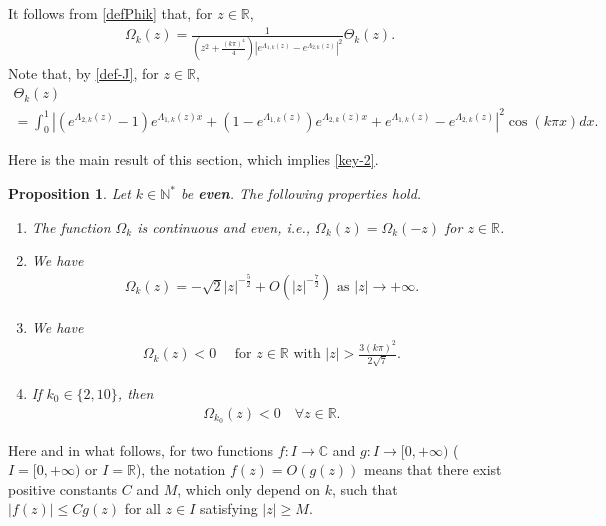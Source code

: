 \documentclass[11pt, reqno]{amsart}
\theoremstyle{plain}
\newtheorem{proposition}[thm]{Proposition}
\numberwithin{equation}{section}
\newcommand{\mR}{\mathbb{R}}
\newcommand{\mN}{\mathbb{N}}
\begin{document}
 It follows from \eqref{defPhik} that, for $z \in \mR$,
 \begin{align}	\label{Omegakformula}
        \Omega_k(z) = \frac{1}{\left(z^2 + \frac{(k \pi)^4}{4} \right) \left|e^{\Lambda_{1,k}(z)} - e^{\Lambda_{2,k}(z)} \right|^2} \Theta_k(z). 
 \end{align}
Note that, by \eqref{def-J}, for $z \in \mR$, 
 \begin{multline}	\label{Thetakformula}
\Theta_k(z) \\[6pt]
= \int_0^1 \left| \left(e^{\Lambda_{2,k}(z)} - 1 \right) e^{\Lambda_{1,k}(z) x} + \left(1 - e^{\Lambda_{1,k}(z)} \right) e^{\Lambda_{2,k}(z) x} + e^{\Lambda_{1,k}(z)} - e^{\Lambda_{2,k}(z)} \right|^2 \cos(k \pi x) dx. 
 \end{multline}
 


Here is the main result of this section, which implies \eqref{key-2}.

\begin{proposition} \label{as-behavior}  \label{sign}  \label{even+continuous} 
Let $k \in \mN^*$  be {\bf even}. The following properties hold. 
\begin{enumerate}
	\item[1)] \label{Oeven} The function $\Omega_k$ is continuous and even, i.e.,  $\Omega_k(z) = \Omega_k(-z)$ for  $z \in \mR$.
	 
    \item[2)] \label{Oasym} We have
    \begin{align}  
       \Omega_k(z) = -\sqrt{2} |z|^{-\frac{5}{2}} + O \left(|z|^{-\frac{7}{2}} \right) \text{ as }  |z| \to +\infty.
    \end{align}
    	\item[3)] We have
    	\begin{align}
    		\Omega_k(z) < 0 \quad \mbox{ for } z \in \mR \mbox{ with }  |z| > \frac{3(k \pi)^2}{2 \sqrt{7}}.
    	\end{align}
    \item[4)] \label{Onegative} If $k_0 \in \{2, 10\}$, then
    \begin{align}
        \Omega_{k_0}(z) < 0 \quad \forall z \in \mathbb{R}.
    \end{align}
\end{enumerate}
\end{proposition}

Here and in what follows, for two functions $f: I \to \mathbb{C}$ and $g: I \to [0, + \infty)$ ($I = [0,+\infty)$ or $I = \mR$), the notation $f(z) = O(g(z))$ means that there exist positive constants $C$ and $M$, which only depend on $k$, such that $|f(z)| \leq C g(z)$ for all  $z \in I$ satisfying $|z| \geq M$. 
\end{document}
